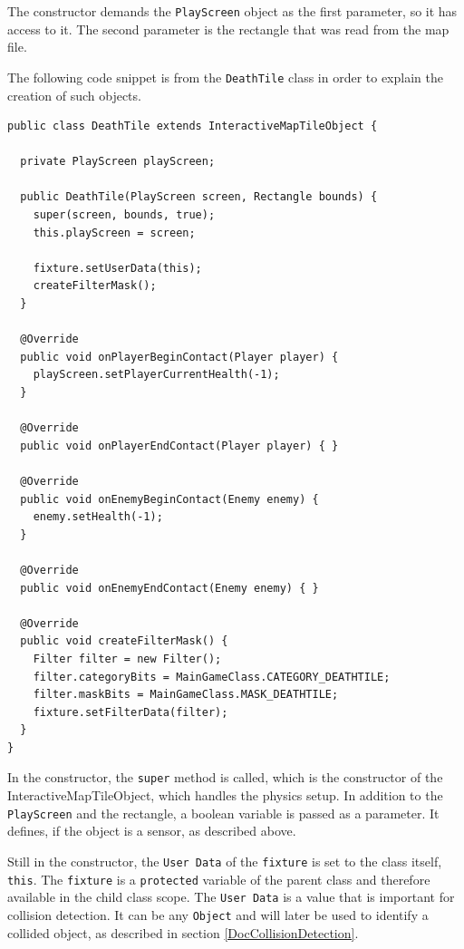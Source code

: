 \documentclass[12p]{article}
\begin{document}

The constructor demands the \texttt{PlayScreen} object as the first parameter, so it has access to it. The second parameter is the rectangle that was read from the map file.

The following code snippet is from the \texttt{DeathTile} class in order to explain the creation of such objects.

\begin{verbatim}
public class DeathTile extends InteractiveMapTileObject {

  private PlayScreen playScreen;

  public DeathTile(PlayScreen screen, Rectangle bounds) {
    super(screen, bounds, true);
    this.playScreen = screen;

    fixture.setUserData(this);
    createFilterMask();
  }

  @Override
  public void onPlayerBeginContact(Player player) {
    playScreen.setPlayerCurrentHealth(-1);
  }

  @Override
  public void onPlayerEndContact(Player player) { }

  @Override
  public void onEnemyBeginContact(Enemy enemy) {
    enemy.setHealth(-1);
  }

  @Override
  public void onEnemyEndContact(Enemy enemy) { }

  @Override
  public void createFilterMask() {
    Filter filter = new Filter();
    filter.categoryBits = MainGameClass.CATEGORY_DEATHTILE;
    filter.maskBits = MainGameClass.MASK_DEATHTILE;
    fixture.setFilterData(filter);
  }
}
\end{verbatim}

In the constructor, the \texttt{super} method is called, which is the constructor of the InteractiveMapTileObject, which handles the physics setup. In addition to the \texttt{PlayScreen} and the rectangle, a boolean variable is passed as a parameter. It defines, if the object is a sensor, as described above.

Still in the constructor, the \texttt{User Data} of the \texttt{fixture} is set to the class itself, \texttt{this}. The \texttt{fixture} is a \texttt{protected} variable of the parent class and therefore available in the child class scope. The \texttt{User Data} is a value that is important for collision detection. It can be any \texttt{Object} and will later be used to identify a collided object, as described in section \ref{DocCollisionDetection}.
\end{document}
